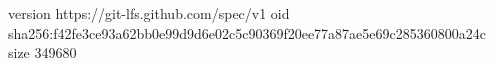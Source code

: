 version https://git-lfs.github.com/spec/v1
oid sha256:f42fe3ce93a62bb0e99d9d6e02c5c90369f20ee77a87ae5e69c285360800a24c
size 349680
